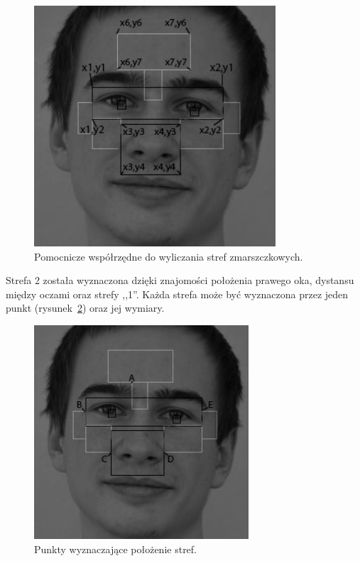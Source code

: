 \documentclass[a4paper,twoside,12pt]{book}
\begin{document}
    \begin{figure}
        \centering
        \includegraphics[width=9cm]{Obrazy/wspolrzedneDoWyliczeniaStref.jpg}
        \caption{Pomocnicze współrzędne do wyliczania stref zmarszczkowych.}
        \label{fig.wspolrzedneDoWyliczeniaStref}
    \end{figure}

    Strefa 2 została wyznaczona dzięki znajomości położenia prawego oka, dystansu między oczami oraz strefy ,,1''.
    Każda strefa może być wyznaczona przez jeden punkt (rysunek~\ref{fig.wykrywanieStrefZmarszczkowychPunkty})
    oraz jej wymiary.

    \begin{figure}
        \centering
        \includegraphics[width=8cm]{Obrazy/wykrywanieStrefZmarszczkowychPunkty.jpg}
        \caption{Punkty wyznaczające położenie stref.}
        \label{fig.wykrywanieStrefZmarszczkowychPunkty}
    \end{figure}
\end{document}

